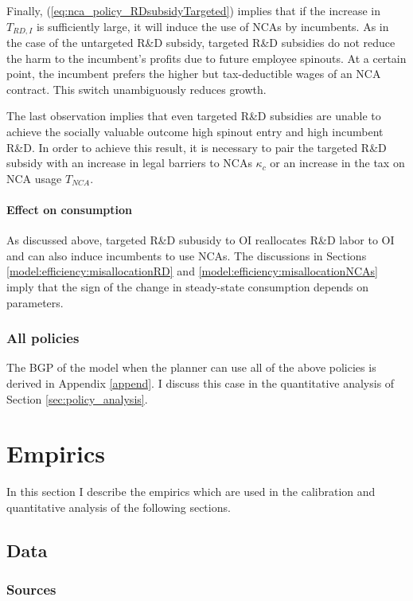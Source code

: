 \documentclass[11pt,english]{article}
\begin{document}
Finally, (\ref{eq:nca_policy_RDsubsidyTargeted}) implies that if the increase in $T_{RD,I}$ is sufficiently large, it will induce the use of NCAs by incumbents. As in the case of the untargeted R\&D subsidy, targeted R\&D subsidies do not reduce the harm to the incumbent's profits due to future employee spinouts. At a certain point, the incumbent prefers the higher but tax-deductible wages of an NCA contract. This switch unambiguously reduces growth.

The last observation implies that even targeted R\&D subsidies are unable to achieve the socially valuable outcome high spinout entry and high incumbent R\&D. In order to achieve this result, it is necessary to pair the targeted R\&D subsidy with an increase in legal barriers to NCAs $\kappa_c$ or an increase in the tax on NCA usage $T_{NCA}$. 

\paragraph{Effect on consumption}

As discussed above, targeted R\&D subusidy to OI reallocates R\&D labor to OI and can also induce incumbents to use NCAs. The discussions in Sections \ref{model:efficiency:misallocationRD} and \ref{model:efficiency:misallocationNCAs} imply that the sign of the change in steady-state consumption depends on parameters.

\subsubsection{All policies}

The BGP of the model when the planner can use all of the above policies is derived in Appendix \ref{append}. I discuss this case in the quantitative analysis of Section \ref{sec:policy_analysis}.


\section{Empirics}\label{sec:empirics}

In this section I describe the empirics which are used in the calibration and quantitative analysis of the following sections.

\subsection{Data}

\subsubsection{Sources}
\end{document}
